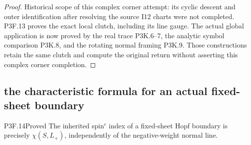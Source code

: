 \begin{proof}
Historical scope of this complex corner attempt: its cyclic descent and outer identification after resolving the source I12 charts were not completed. P3F.13 proves the exact local clutch, including its line gauge. The actual global application is now proved by the real trace P3K.6--7, the analytic symbol comparison P3K.8, and the rotating normal framing P3K.9. Those constructions retain the same clutch and compute the original return without asserting this complex corner completion.
\end{proof}
\subsection{the characteristic formula for an actual fixed-sheet boundary}
\begin{statement}{P3F.14}{Proved}
The inherited spin$^c$ index of a fixed-sheet Hopf boundary is precisely $\chi(S,L_+)$, independently of the negative-weight normal line.
\end{statement}
